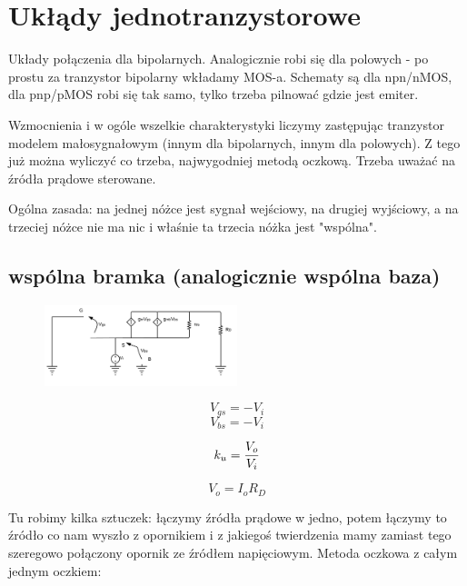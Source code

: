 \documentclass[10pt,a4paper]{article}
\begin{document}
\section{Ukłądy jednotranzystorowe}
Układy połączenia dla bipolarnych. Analogicznie robi się dla polowych - po prostu za tranzystor bipolarny wkładamy MOS-a. Schematy są dla npn/nMOS, dla pnp/pMOS robi się tak samo, tylko trzeba pilnować gdzie jest emiter.

Wzmocnienia i w ogóle wszelkie charakterystyki liczymy zastępując tranzystor modelem małosygnałowym (innym dla bipolarnych, innym dla polowych). Z tego już można wyliczyć co trzeba, najwygodniej metodą oczkową. Trzeba uważać na źródła prądowe sterowane.

Ogólna zasada: na jednej nóżce jest sygnał wejściowy, na drugiej wyjściowy, a na trzeciej nóżce nie ma nic i właśnie ta trzecia nóżka jest "wspólna".
\subsection{wspólna bramka (analogicznie wspólna baza)}

\begin{figure}[H]
\centering
\includegraphics[width=0.5\textwidth]{CG}
\end{figure}

\begin{equation}
V_{gs} = -V_i
\end{equation}
\begin{equation}
V_{bs} = -V_i
\end{equation}

\begin{equation}
k_u = {V_o \over V_i}
\end{equation}

\begin{equation}
V_o = I_o R_D
\end{equation}

Tu robimy kilka sztuczek: łączymy źródła prądowe w jedno, potem łączymy to źródło co nam wyszło z opornikiem i z jakiegoś twierdzenia mamy zamiast tego szeregowo połączony opornik ze źródłem napięciowym. Metoda oczkowa z całym jednym oczkiem:
\end{document}
